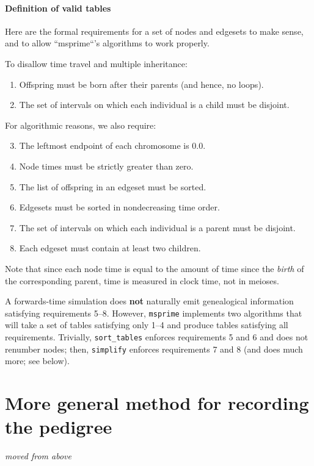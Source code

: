 \documentclass{article}
\newcommand{\msprime}{\texttt{msprime}}
\newcommand{\plr}[1]{{\em \color{blue} #1}}
\begin{document}
\paragraph{Definition of valid tables}
Here are the formal requirements for a set of nodes and edgesets to make sense,
and to allow ``msprime``'s algorithms to work properly.

To disallow time travel and multiple inheritance:
\begin{enumerate}
    \item Offspring must be born after their parents (and hence, no loops).
    \item The set of intervals on which each individual is a child must be disjoint.
\end{enumerate}
For algorithmic reasons, we also require:
\begin{enumerate} \setcounter{enumi}{2}
    \item The leftmost endpoint of each chromosome is 0.0.
    \item Node times must be strictly greater than zero.
    \item The list of offspring in an edgeset must be sorted.
    \item Edgesets must be sorted in nondecreasing time order.
    \item The set of intervals on which each individual is a parent must be disjoint.
    \item Each edgeset must contain at least two children.
\end{enumerate}
Note that since each node time is equal to the amount of time since the \emph{birth} of the
corresponding parent, time is measured in clock time, not in meioses.

A forwards-time simulation does \textbf{not} naturally emit genealogical information
satisfying requirements 5--8.
However, \msprime{} implements two algorithms that will take a set of tables
satisfying only 1--4 and produce tables satisfying all requirements.
Trivially, \texttt{sort\_tables} enforces requirements 5 and 6 and does not renumber nodes;
then, \texttt{simplify} enforces requirements 7 and 8 (and does much more; see below).


\section{More general method for recording the pedigree}

\plr{moved from above}
\end{document}
